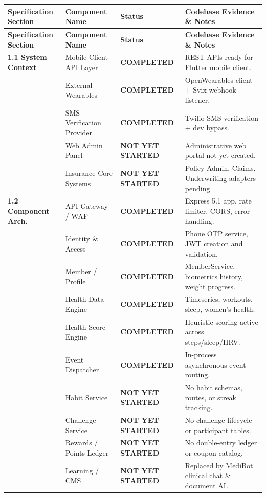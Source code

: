 \documentclass[11pt,a4paper]{article}
\begin{document}
\begin{longtable}{p{4.2cm} p{3.2cm} p{3.2cm} p{4.4cm}}
    \toprule
    \textbf{Specification Section} & \textbf{Component Name} & \textbf{Status} & \textbf{Codebase Evidence \& Notes} \\
    \midrule
    \endfirsthead
    \toprule
    \textbf{Specification Section} & \textbf{Component Name} & \textbf{Status} & \textbf{Codebase Evidence \& Notes} \\
    \midrule
    \endhead

    \textbf{1.1 System Context} & Mobile Client API Layer & \textcolor{statuscompleted}{\textbf{COMPLETED}} & REST APIs ready for Flutter mobile client. \\
    & External Wearables & \textcolor{statuscompleted}{\textbf{COMPLETED}} & OpenWearables client + Svix webhook listener. \\
    & SMS Verification Provider & \textcolor{statuscompleted}{\textbf{COMPLETED}} & Twilio SMS verification + dev bypass. \\
    & Web Admin Panel & \textcolor{statusnotstarted}{\textbf{NOT YET STARTED}} & Administrative web portal not yet created. \\
    & Insurance Core Systems & \textcolor{statusnotstarted}{\textbf{NOT YET STARTED}} & Policy Admin, Claims, Underwriting adapters pending. \\
    \midrule

    \textbf{1.2 Component Arch.} & API Gateway / WAF & \textcolor{statuscompleted}{\textbf{COMPLETED}} & Express 5.1 app, rate limiter, CORS, error handling. \\
    & Identity \& Access & \textcolor{statuscompleted}{\textbf{COMPLETED}} & Phone OTP service, JWT creation and validation. \\
    & Member / Profile & \textcolor{statuscompleted}{\textbf{COMPLETED}} & MemberService, biometrics history, weight progress. \\
    & Health Data Engine & \textcolor{statuscompleted}{\textbf{COMPLETED}} & Timeseries, workouts, sleep, women's health. \\
    & Health Score Engine & \textcolor{statuscompleted}{\textbf{COMPLETED}} & Heuristic scoring active across steps/sleep/HRV. \\
    & Event Dispatcher & \textcolor{statuscompleted}{\textbf{COMPLETED}} & In-process asynchronous event routing. \\
    & Habit Service & \textcolor{statusnotstarted}{\textbf{NOT YET STARTED}} & No habit schemas, routes, or streak tracking. \\
    & Challenge Service & \textcolor{statusnotstarted}{\textbf{NOT YET STARTED}} & No challenge lifecycle or participant tables. \\
    & Rewards / Points Ledger & \textcolor{statusnotstarted}{\textbf{NOT YET STARTED}} & No double-entry ledger or coupon catalog. \\
    & Learning / CMS & \textcolor{statusnotstarted}{\textbf{NOT YET STARTED}} & Replaced by MediBot clinical chat \& document AI. \\
    \midrule


\end{longtable}
\end{document}
